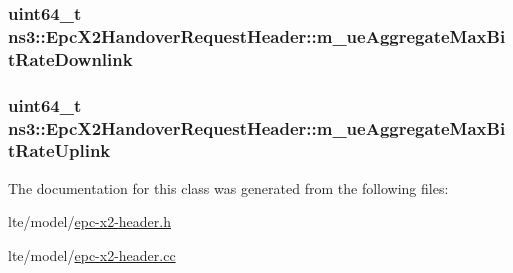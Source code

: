 \subsubsection[{\texorpdfstring{m\+\_\+ue\+Aggregate\+Max\+Bit\+Rate\+Downlink}{m_ueAggregateMaxBitRateDownlink}}]{\setlength{\rightskip}{0pt plus 5cm}uint64\+\_\+t ns3\+::\+Epc\+X2\+Handover\+Request\+Header\+::m\+\_\+ue\+Aggregate\+Max\+Bit\+Rate\+Downlink\hspace{0.3cm}{\ttfamily [private]}}\hypertarget{classns3_1_1EpcX2HandoverRequestHeader_aebe77ff780afed71a9723a06cf07b83f}{}\label{classns3_1_1EpcX2HandoverRequestHeader_aebe77ff780afed71a9723a06cf07b83f}
\subsubsection[{\texorpdfstring{m\+\_\+ue\+Aggregate\+Max\+Bit\+Rate\+Uplink}{m_ueAggregateMaxBitRateUplink}}]{\setlength{\rightskip}{0pt plus 5cm}uint64\+\_\+t ns3\+::\+Epc\+X2\+Handover\+Request\+Header\+::m\+\_\+ue\+Aggregate\+Max\+Bit\+Rate\+Uplink\hspace{0.3cm}{\ttfamily [private]}}\hypertarget{classns3_1_1EpcX2HandoverRequestHeader_a3e0ee6a533a2b73117d0a154670115a4}{}\label{classns3_1_1EpcX2HandoverRequestHeader_a3e0ee6a533a2b73117d0a154670115a4}


The documentation for this class was generated from the following files\+:\begin{DoxyCompactItemize}
\item 
lte/model/\hyperlink{epc-x2-header_8h}{epc-\/x2-\/header.\+h}\item 
lte/model/\hyperlink{epc-x2-header_8cc}{epc-\/x2-\/header.\+cc}\end{DoxyCompactItemize}
